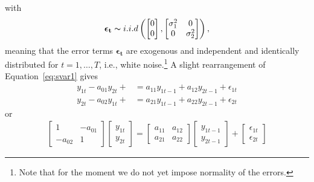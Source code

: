 \documentclass[a4paper,11pt,listof=nochaptergap,oneside,pointednumbers,bibtotoc,bigheadings,liststotoc]{scrbook}
\newcommand{\vect}[1]{\boldsymbol{\mathbf{#1}}}
\begin{document}
with 
\begin{equation}
\begin{split}
	\vect{\epsilon_t} \thicksim i.i.d \left (  \begin{bmatrix}
    							0 \\
    							0
 							 \end{bmatrix}, \begin{bmatrix}
    							\sigma_{1}^2 & 0  \\
    							0 & \sigma_{2}^2
 							 \end{bmatrix} \right ),
\end{split}								
\end{equation}
meaning that the error terms $\vect{\epsilon_t}$ are exogenous and independent and identically distributed  for $t = 1, \dots, T$, i.e., white noise.\footnote{Note that for the moment we do not yet impose normality of the errors.} A slight rearrangement of Equation~\ref{eq:svar1} gives 
\begin{equation} \label{eq:svar2}
\begin{split}
	y_{1t} - a_{01}y_{2t} + & = a_{11}y_{1t-1} + a_{12}y_{2t-1} + \epsilon_{1t} \\
	y_{2t} - a_{02}y_{1t} +  & = a_{21}y_{1t-1} + a_{22}y_{2t-1} + \epsilon_{2t}
\end{split}								
\end{equation}
or 
\begin{equation} \label{eq:svar3}
\begin{split}
	\begin{bmatrix}
    	1 & -a_{01} \\
    	-a_{02} & 1
 	\end{bmatrix}
	\begin{bmatrix}
    	y_{1t} \\
    	y_{2t}
 	\end{bmatrix} = 
	\begin{bmatrix}
    	a_{11} & a_{12} \\
    	a_{21} & a_{22}
 	\end{bmatrix} 
	\begin{bmatrix}
    	y_{1t-1} \\
    	y_{2t-1}
 	\end{bmatrix} +
	\begin{bmatrix}
    	\epsilon_{1t} \\
    	\epsilon_{2t}
 	\end{bmatrix} 
\end{split}								
\end{equation}
\end{document}
